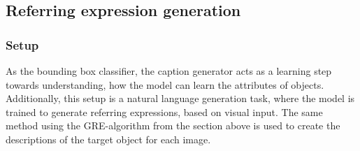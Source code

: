 \subsection{Referring expression generation}
\label{sec:referring_expression_generation}
\subsubsection*{Setup}

As the bounding box classifier, the caption generator acts as a learning step towards understanding, how the model can learn the attributes of objects.
Additionally, this setup is a natural language generation task, where the model is trained to generate referring expressions, based on visual input.
The same method using the GRE-algorithm from the section above is used to create the descriptions of the target object for each image.

